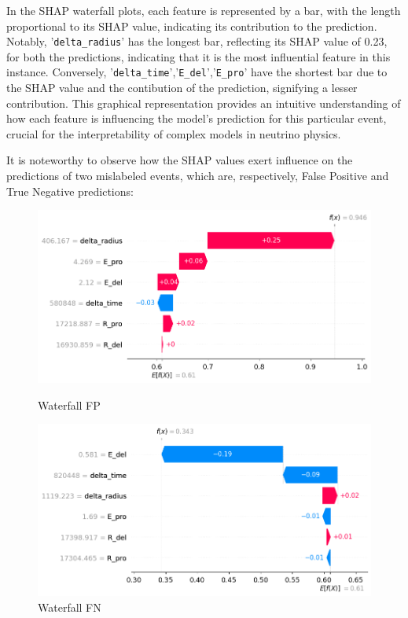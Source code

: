 In the SHAP waterfall plots, each feature is represented by a bar, with the length proportional to its SHAP value, indicating its contribution to the prediction. Notably, '\texttt{delta\_radius}' has the longest bar, reflecting its SHAP value of 0.23, for both the predictions, indicating that it is the most influential feature in this instance. Conversely, '\texttt{delta\_time}','\texttt{E\_del}','\texttt{E\_pro}' have the shortest bar due to the SHAP value and the contibution of the prediction, signifying a lesser contribution. This graphical representation provides an intuitive understanding of how each feature is influencing the model's prediction for this particular event, crucial for the interpretability of complex models in neutrino physics.\\
\newline

It is noteworthy to observe how the SHAP values exert influence on the predictions of two mislabeled events, which are, respectively, False Positive and True Negative predictions:


\begin{figure}[h!]
	\centering
	\begin{minipage}{0.5\textwidth}
		\centering
		\includegraphics[width=\linewidth]{Images/Shap/waterfall_FP}
		\caption{Waterfall FP}
		\label{fig:waterfall_FP}
	\end{minipage}%
	\begin{minipage}{0.5\textwidth}
		\centering
		\includegraphics[width=\linewidth]{Images/Shap/waterfall_TN}
		\caption{Waterfall FN}
		\label{fig:waterfall_FN}
	\end{minipage}
\end{figure}


